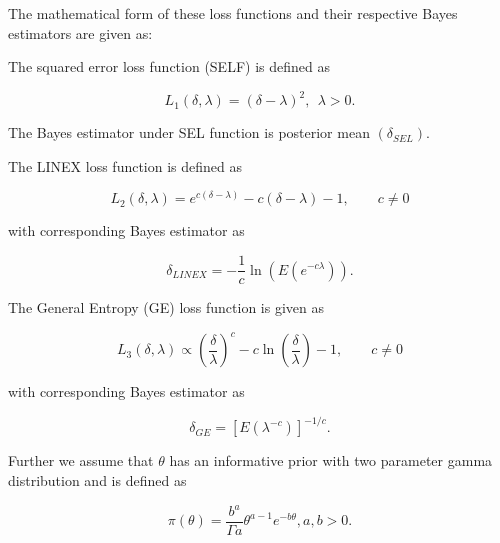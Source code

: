 \documentclass[11pt,a4paper]{article}
\numberwithin{equation}{section}
\begin{document}
	The mathematical form of these loss functions and their respective Bayes estimators are given as:

	The squared error loss function (SELF) is defined as

	\begin{equation}

		L_{1}(\delta, \lambda)=	(\delta- \lambda)^2,~~ \lambda>0.

	\end{equation}

	The Bayes estimator under SEL function is posterior mean $\left(\delta_{SEL}\right).$ 

	The LINEX loss function is defined as

	\begin{equation}\label{linexloss}

		L_{2}(\delta, \lambda)=e^{c(\delta- \lambda)}-c(\delta- \lambda)-1,\qquad c\ne 0

	\end{equation}

	with corresponding Bayes estimator as

	\begin{equation*}\label{linexbayes}

		\delta_{LINEX}=-\dfrac{1}{c}\ln \left(E(e^{-c \lambda})\right).

	\end{equation*}

	The General Entropy (GE) loss function is given as

	\begin{equation}\label{GEloss}

		L_3(\delta,\lambda)\propto \left(\dfrac{\delta}{\lambda}\right)^c-c\ln\left(\dfrac{\delta}{\lambda}\right)-1,\qquad c\ne  0

	\end{equation}

	with corresponding Bayes estimator as

	\begin{equation*}\label{GEbayes}

		\delta_{GE}=	\left[E(\lambda^{-c})\right]^{-1/c}.

	\end{equation*}

	Further we assume that $\theta$ has an informative prior with two parameter gamma distribution and is defined as

	\begin{equation}\label{prior.i}

		\pi(\theta)=\frac{b^{a}}{\Gamma{a}}{\theta^{a-1}}e^{-b\theta}, a,b>0.

	\end{equation}
\end{document}
